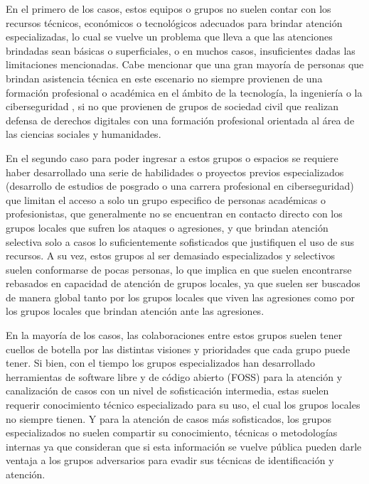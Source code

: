 \documentclass[12pt]{caltech_thesis}
\begin{document}
En el primero de los casos, estos equipos o grupos no suelen contar con los recursos técnicos, económicos o tecnológicos adecuados para brindar atención especializadas, lo cual se vuelve un problema que lleva a que las atenciones brindadas sean básicas o superficiales, o en muchos casos, insuficientes dadas las limitaciones mencionadas. Cabe mencionar que una gran mayoría de personas que brindan asistencia técnica en este escenario no siempre provienen de una formación profesional o académica en el ámbito de la tecnología, la ingeniería o la ciberseguridad , si no que provienen de grupos de sociedad civil que realizan defensa de derechos digitales  con una formación profesional orientada al área de las ciencias sociales y humanidades.

En el segundo caso para poder ingresar a estos grupos o espacios se requiere haber desarrollado una serie de habilidades o proyectos previos especializados (desarrollo de estudios de posgrado o una carrera profesional en ciberseguridad) que limitan el acceso a solo un grupo especifico de personas académicas o profesionistas, que generalmente no se encuentran en contacto directo con los grupos locales que sufren los ataques o agresiones, y que brindan atención selectiva solo a casos lo suficientemente sofisticados que justifiquen el uso de sus recursos. A su vez, estos grupos al ser demasiado especializados y selectivos suelen conformarse de pocas personas, lo que implica en que suelen encontrarse rebasados en capacidad de atención de grupos locales, ya que suelen ser buscados de manera global tanto por los grupos locales que viven las agresiones como por los grupos locales que brindan atención ante las agresiones.

En la mayoría de los casos, las colaboraciones entre estos grupos suelen tener cuellos de botella  por las distintas visiones y prioridades que cada grupo puede tener. Si bien, con el tiempo los grupos especializados han desarrollado herramientas de software libre  y de código abierto  (FOSS)  para la atención y canalización de casos con un nivel de sofisticación intermedia, estas suelen requerir conocimiento técnico especializado para su uso, el cual los grupos locales no siempre tienen. Y para la atención de casos más sofisticados, los grupos especializados no suelen compartir su conocimiento, técnicas o metodologías internas ya que consideran que si esta información se vuelve pública pueden darle ventaja a los grupos adversarios para evadir sus técnicas de identificación y atención.
\end{document}
